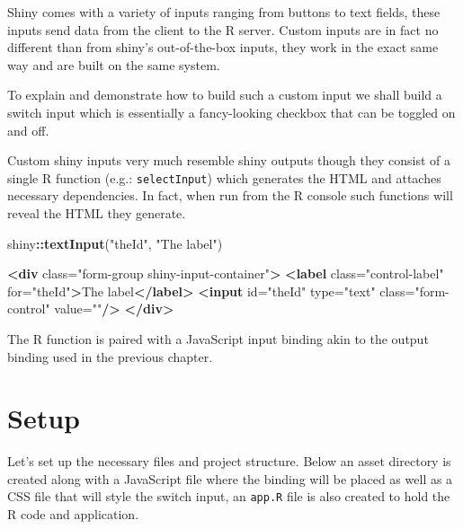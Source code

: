 \documentclass[
]{krantz}
\makeatletter
\newenvironment{Shaded}{\begin{snugshade}}{\end{snugshade}}
\newcommand{\KeywordTok}[1]{\textcolor[rgb]{0.27,0.27,0.27}{\textbf{#1}}}
\newcommand{\NormalTok}[1]{#1}
\newcommand{\OperatorTok}[1]{\textcolor[rgb]{0.43,0.43,0.43}{\textbf{#1}}}
\newcommand{\OtherTok}[1]{\textcolor[rgb]{0.37,0.37,0.37}{#1}}
\newcommand{\StringTok}[1]{\textcolor[rgb]{0.5,0.5,0.5}{#1}}
\newenvironment{kframe}{%
\medskip{}
\setlength{\fboxsep}{.8em}
 \def\at@end@of@kframe{}%
 \ifinner\ifhmode%
  \def\at@end@of@kframe{\end{minipage}}%
  \begin{minipage}{\columnwidth}%
 \fi\fi%
 \def\FrameCommand##1{\hskip\@totalleftmargin \hskip-\fboxsep
 \colorbox{shadecolor}{##1}\hskip-\fboxsep
     \hskip-\linewidth \hskip-\@totalleftmargin \hskip\columnwidth}%
 \MakeFramed {\advance\hsize-\width
   \@totalleftmargin\z@ \linewidth\hsize
   \@setminipage}}%
 {\par\unskip\endMakeFramed%
 \at@end@of@kframe}
\renewenvironment{Shaded}{\begin{kframe}}{\end{kframe}}
\makeatother
\begin{document}
Shiny comes with a variety of inputs ranging from buttons to text fields, these inputs send data from the client to the R server. Custom inputs are in fact no different than from shiny's out-of-the-box inputs, they work in the exact same way and are built on the same system.

To explain and demonstrate how to build such a custom input we shall build a switch input which is essentially a fancy-looking checkbox that can be toggled on and off.

Custom shiny inputs very much resemble shiny outputs though they consist of a single R function (e.g.: \texttt{selectInput}) which generates the HTML and attaches necessary dependencies. In fact, when run from the R console such functions will reveal the HTML they generate.

\begin{Shaded}
\begin{Highlighting}[]
\NormalTok{shiny}\OperatorTok{::}\KeywordTok{textInput}\NormalTok{(}\StringTok{"theId"}\NormalTok{, }\StringTok{"The label"}\NormalTok{)   }
\end{Highlighting}
\end{Shaded}

\begin{Shaded}
\begin{Highlighting}[]
\KeywordTok{<div}\OtherTok{ class=}\StringTok{"form{-}group shiny{-}input{-}container"}\KeywordTok{>}
  \KeywordTok{<label}\OtherTok{ class=}\StringTok{"control{-}label"}\OtherTok{ for=}\StringTok{"theId"}\KeywordTok{>}\NormalTok{The label}\KeywordTok{</label>}
  \KeywordTok{<input}\OtherTok{ id=}\StringTok{"theId"}\OtherTok{ type=}\StringTok{"text"}\OtherTok{ class=}\StringTok{"form{-}control"}\OtherTok{ value=}\StringTok{""}\KeywordTok{/>}
\KeywordTok{</div>}
\end{Highlighting}
\end{Shaded}

The R function is paired with a JavaScript input binding akin to the output binding used in the previous chapter.

\hypertarget{shiny-input-setup}{%
\section{Setup}\label{shiny-input-setup}}

Let's set up the necessary files and project structure. Below an asset directory is created along with a JavaScript file where the binding will be placed as well as a CSS file that will style the switch input, an \texttt{app.R} file is also created to hold the R code and application.
\end{document}
